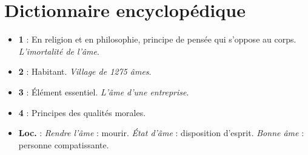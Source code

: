 
\section{Dictionnaire encyclopédique}

\begin{itemize}[leftmargin=1cm, label=, itemsep=1pt]
\item {\bf 1} : En religion et en philosophie, principe de pensée qui s'oppose au corps. {\it L'imortalité de l'âme}.
\item {\bf 2} : Habitant. {\it Village de 1275 âmes}.
\item {\bf 3} : Élément essentiel. {\it L'âme d'une entreprise}.
\item {\bf 4} : Principes des qualités morales.
\item {\bf Loc.} : {\it Rendre l'âme} : mourir. {\it État d'âme} : disposition d'esprit. {\it Bonne âme} : personne compatissante.
\end{itemize}

